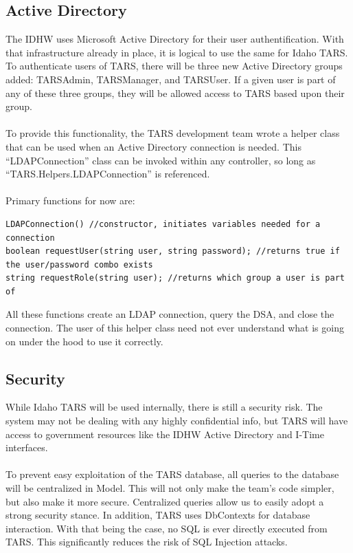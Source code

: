 \documentclass[letterpaper]{article}
\begin{document}
\subsection{Active Directory}
The IDHW uses Microsoft Active Directory for their user authentification. With that infrastructure already in place, it is logical to use the same for Idaho TARS. To authenticate users of TARS, there will be three new Active Directory groups added: TARSAdmin, TARSManager, and TARSUser. If a given user is part of any of these three groups, they will be allowed access to TARS based upon their group. \\
\\
To provide this functionality, the TARS development team wrote a helper class that can be used when an Active Directory connection is needed. This ``LDAPConnection'' class can be invoked within any controller, so long as ``TARS.Helpers.LDAPConnection'' is referenced.\\
\\
Primary functions for now are:
\begin{verbatim}
LDAPConnection() //constructor, initiates variables needed for a connection
boolean requestUser(string user, string password); //returns true if the user/password combo exists
string requestRole(string user); //returns which group a user is part of
\end{verbatim}
All these functions create an LDAP connection, query the DSA, and close the connection. The user of this helper class need not ever understand what is going on under the hood to use it correctly. 

\subsection{Security}
While Idaho TARS will be used internally, there is still a security risk. The system may not be dealing with any highly confidential info, but TARS will have access to government resources like the IDHW Active Directory and I-Time interfaces.\\
\\
To prevent easy exploitation of the TARS database, all queries to the database will be centralized in Model. This will not only make the team's code simpler, but also make it more secure. Centralized queries allow us to easily adopt a strong security stance. In addition, TARS uses DbContexts for database interaction. With that being the case, no SQL is ever directly executed from TARS. This significantly reduces the risk of SQL Injection attacks.
\end{document}
